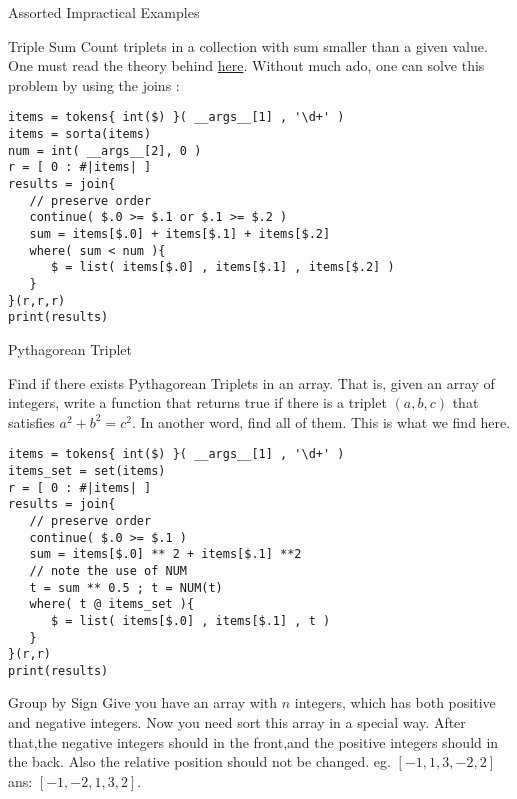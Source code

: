 \begin{section}{Assorted Impractical Examples}
\begin{subsection}{Triple Sum}
Count triplets in a collection with sum smaller than a given value.
One must read the theory behind \href{https://en.wikipedia.org/wiki/3SUM}{here}.
Without much ado, one can solve this problem by using the joins :

\begin{center}\begin{minipage}{\linewidth}
\begin{lstlisting}[style=JexlStyle]
items = tokens{ int($) }( __args__[1] , '\d+' )
items = sorta(items)
num = int( __args__[2], 0 )
r = [ 0 : #|items| ]
results = join{
   // preserve order  
   continue( $.0 >= $.1 or $.1 >= $.2 )
   sum = items[$.0] + items[$.1] + items[$.2]
   where( sum < num ){ 
      $ = list( items[$.0] , items[$.1] , items[$.2] )
   }
}(r,r,r)
print(results)
\end{lstlisting}  
\end{minipage}\end{center} 
\end{subsection}

\begin{subsection}{Pythagorean Triplet}

Find if there exists Pythagorean Triplets in an array. That is, 
given an array of integers, write a function that returns true 
if there is a triplet $(a, b, c)$ that satisfies $a^2 + b^2 = c^2$.
In another word, find all of them. This is what we find here.

\begin{center}\begin{minipage}{\linewidth}
\begin{lstlisting}[style=JexlStyle]
items = tokens{ int($) }( __args__[1] , '\d+' )
items_set = set(items)
r = [ 0 : #|items| ]
results = join{
   // preserve order  
   continue( $.0 >= $.1 )
   sum = items[$.0] ** 2 + items[$.1] **2 
   // note the use of NUM 
   t = sum ** 0.5 ; t = NUM(t) 
   where( t @ items_set ){ 
      $ = list( items[$.0] , items[$.1] , t )
   }
}(r,r)
print(results)
\end{lstlisting}  
\end{minipage}\end{center} 
\end{subsection}

\begin{subsection}{Group by Sign}
Give you have an array with $n$ integers, which has both positive and negative integers.
Now you need sort this array in a special way.
After that,the negative integers should in the front,and the positive integers should in the back.
Also the relative position should not be changed. 
eg. $[-1, 1, 3, -2, 2] $ ans: $[-1, -2, 1, 3, 2]$. 


\end{subsection}
\end{section}
